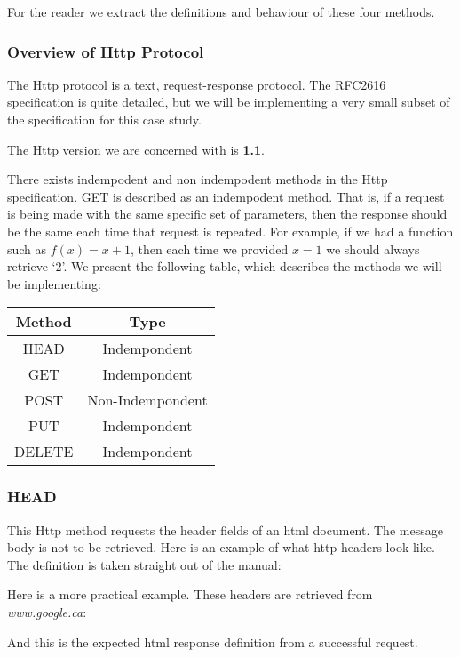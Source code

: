 For the reader we extract the definitions and behaviour of these four methods.
\subsubsection{Overview of Http Protocol}
The Http protocol is a text, request-response protocol. The RFC2616 
specification is quite detailed, but we will be implementing a very 
small subset of the specification for this case study.

The Http version we are concerned with is \textbf{1.1}.

There exists indempodent and non indempodent methods in the Http specification.
GET is described as an indempodent method. That is, if a request is being made
with the same specific set of parameters, then the response should be the same
each time that request is repeated. For example, if we had a function such as
$ f(x) = x + 1 $, then each time we provided $ x = 1 $ we should always retrieve
`2'. We present the following table, which describes the methods we will be 
implementing:
\\
\begin{center}
\begin{tabular}{| c | c |}
\hline
\textbf{Method} & \textbf{Type} \\ \hline \hline
HEAD   & Indempondent \\
GET    & Indempondent \\
POST   & Non-Indempondent \\
PUT    & Indempondent \\ 
DELETE & Indempondent \\
\hline
\end{tabular}
\end{center}
\subsubsection{HEAD}
This Http method requests the header fields of an html document. The message
body is not to be retrieved. Here is an example of what http headers look like.
The definition is taken straight out of the manual: 


Here is a more practical example. These headers are retrieved from \textit{www.google.ca}:


And this is the expected html response definition from a successful request.


